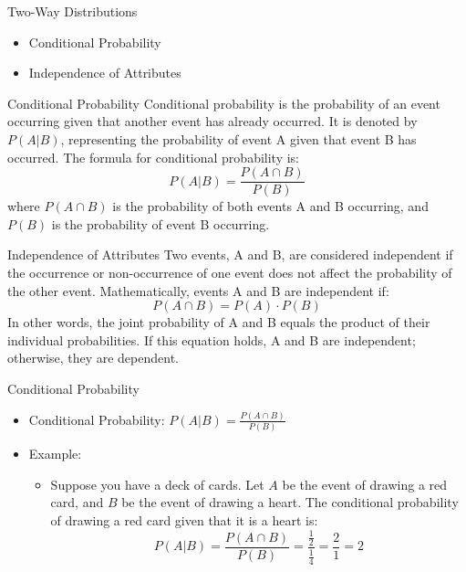 \documentclass{beamer}
\begin{document}
\begin{frame}{Two-Way Distributions}
  \begin{itemize}
    \item Conditional Probability
    \item Independence of Attributes
  \end{itemize}
\end{frame}

\begin{frame}{Conditional Probability}
  Conditional probability is the probability of an event occurring given that another event has already occurred. It is denoted by \( P(A | B) \), representing the probability of event A given that event B has occurred. The formula for conditional probability is:
  \[ P(A | B) = \frac{P(A \cap B)}{P(B)} \]
  where \( P(A \cap B) \) is the probability of both events A and B occurring, and \( P(B) \) is the probability of event B occurring.
\end{frame}

\begin{frame}{Independence of Attributes}
  Two events, A and B, are considered independent if the occurrence or non-occurrence of one event does not affect the probability of the other event. Mathematically, events A and B are independent if:
  \[ P(A \cap B) = P(A) \cdot P(B) \]
  In other words, the joint probability of A and B equals the product of their individual probabilities. If this equation holds, A and B are independent; otherwise, they are dependent.
\end{frame}


\begin{frame}{Conditional Probability}
  \begin{itemize}
    \item Conditional Probability: \( P(A | B) = \frac{P(A \cap B)}{P(B)} \)
    \item Example:
      \begin{itemize}
        \item Suppose you have a deck of cards. Let \( A \) be the event of drawing a red card, and \( B \) be the event of drawing a heart. The conditional probability of drawing a red card given that it is a heart is:
        \[ P(A | B) = \frac{P(A \cap B)}{P(B)} = \frac{\frac{1}{2}}{\frac{1}{4}} = \frac{2}{1} = 2 \]
      \end{itemize}
  \end{itemize}
\end{frame}
\end{document}

